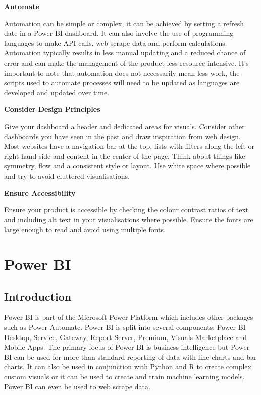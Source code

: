 \documentclass[
]{book}
\begin{document}
\textbf{Automate }

Automation can be simple or complex, it can be achieved by setting a refresh date in a Power BI dashboard. It can also involve the use of programming languages to make API calls, web scrape data and perform calculations. Automation typically results in less manual updating and a reduced chance of error and can make the management of the product less resource intensive. It's important to note that automation does not necessarily mean less work, the scripts used to automate processes will need to be updated as languages are developed and updated over time.

\textbf{Consider Design Principles}

Give your dashboard a header and dedicated areas for visuals. Consider other dashboards you have seen in the past and draw inspiration from web design. Most websites have a navigation bar at the top, lists with filters along the left or right hand side and content in the center of the page. Think about things like symmetry, flow and a consistent style or layout. Use white space where possible and try to avoid cluttered visualisations.

\textbf{Ensure Accessibility}

Ensure your product is accessible by checking the colour contrast ratios of text and including alt text in your visualisations where possible. Ensure the fonts are large enough to read and avoid using multiple fonts.

\hypertarget{power-bi}{%
\chapter{Power BI}\label{power-bi}}

\hypertarget{introduction}{%
\section{Introduction}\label{introduction}}

Power BI is part of the Microsoft Power Platform which includes other packages such as Power Automate. Power BI is split into several components: Power BI Desktop, Service, Gateway, Report Server, Premium, Visuals Marketplace and Mobile Apps. The primary focus of Power BI is business intelligence but Power BI can be used for more than standard reporting of data with line charts and bar charts. It can also be used in conjunction with Python and R to create complex custom visuals or it can be used to create and train \href{https://docs.microsoft.com/en-us/power-bi/connect-data/service-tutorial-build-machine-learning-model}{machine learning models}. Power BI can even be used to \href{https://docs.microsoft.com/en-us/power-bi/connect-data/desktop-connect-to-web-by-example}{web scrape data}.
\end{document}

